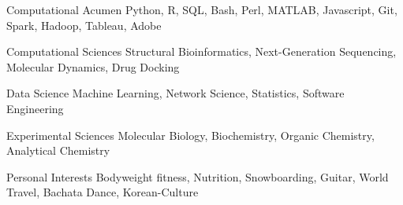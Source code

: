 \vspace{2mm}

\begin{cvskills}

  \cvskill
    {Computational Acumen} %
    {Python, R, SQL, Bash, Perl, MATLAB, Javascript, Git, Spark, Hadoop, Tableau, Adobe} %
    
  \cvskill
    {Computational Sciences} %
    {Structural Bioinformatics, Next-Generation Sequencing, Molecular Dynamics, Drug Docking} %
     
  \cvskill
    {Data Science} %
    {Machine Learning, Network Science, Statistics, Software Engineering} %
    
  \cvskill
    {Experimental Sciences} %
    {Molecular Biology, Biochemistry, Organic Chemistry, Analytical Chemistry} %

  \cvskill
    {Personal Interests} %
    {Bodyweight fitness, Nutrition, Snowboarding, Guitar, World Travel, Bachata Dance, Korean-Culture} %
    
\vspace{-8.0mm}
\end{cvskills}